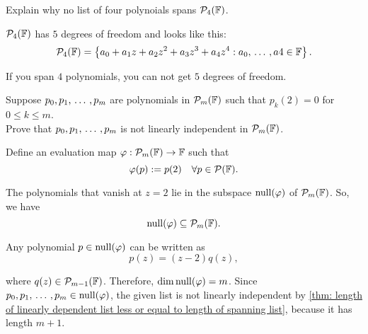 \setcounter{xrcscount}{15}
\begin{xrcs}
  Explain why no list of four polynoials spans $\mathcal{P}_4(\mathbb{F})$.

  \begin{xsol}
    $\mathcal{P}_4(\mathbb{F})$ has $5$ degrees of freedom and looks like this:
    \[
      \mathcal{P}_4(\mathbb{F}) = \left \{a_0 + a_1 z + a_2z^2 + a_3 z^3 + a_4 z^4 : a_0, {\, \ldots \,\,}, a4 \in \mathbb{F} \right \}.
    \]

    If you span $4$ polynomials, you can not get $5$ degrees of freedom.
  \end{xsol}
\end{xrcs}

\setcounter{xrcscount}{19}
\begin{xrcs}
  Suppose $p_0, p_1, {\, \ldots \,\,}, p_m$ are polynomials in $\mathcal{P}_m(\mathbb{F})$ such that $p_k(2) = 0$ for $0\leq k \leq m$. \\
  Prove that $p_0, p_1, {\, \ldots \,\,}, p_m$ is not linearly independent in $\mathcal{P}_m(\mathbb{F})$.

  \begin{xprf}
    Define an evaluation map $\varphi : \mathcal{P}_m(\mathbb{F}) \to \mathbb{F}$ such that
    \[
    \varphi(p) := p(2) \quad \forall p \in \mathcal{P}(\mathbb{F}).
    \]

    The polynomials that vanish at $z=2$ lie in the subspace $\operatorname{null}(\varphi)$ of $\mathcal{P}_m(\mathbb{F})$. So, we have
    \[
    \operatorname{null}(\varphi) \subseteq \mathcal{P}_m(\mathbb{F}).
    \]

    Any polynomial $p \in \operatorname{null}(\varphi)$ can be written as
    \[
    p(z) = (z-2) q(z),
    \]

    where $q(z) \in \mathcal{P}_{m-1} (\mathbb{F})$. Therefore, $\operatorname{dim} \operatorname{null}(\varphi) = m$. Since $p_0, p_1, {\, \ldots \,\,}, p_m \in \operatorname{null}(\varphi)$, the given list is not linearly independent by \ref{thm: length of linearly dependent list less or equal to length of spanning list}, because it has length $m+1$.
  \end{xprf}

\end{xrcs}

